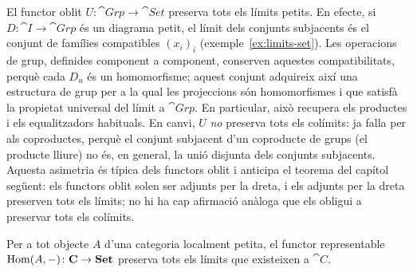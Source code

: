 \begin{exemple}
El functor oblit $U\colon\cat{Grp}\to\cat{Set}$ preserva tots els límits petits. En efecte, si $D\colon\cat{I}\to\cat{Grp}$ és un diagrama petit, el límit dels conjunts subjacents és el conjunt de famílies compatibles $(x_i)_i$ (exemple~\ref{ex:limits-set}). Les operacions de grup, definides component a component, conserven aquestes compatibilitats, perquè cada $D_u$ és un homomorfisme; aquest conjunt adquireix així una estructura de grup per a la qual les projeccions són homomorfismes i que satisfà la propietat universal del límit a $\cat{Grp}$. En particular, això recupera els productes i els equalitzadors habituals. En canvi, $U$ \emph{no} preserva tots els colímits: ja falla per als coproductes, perquè el conjunt subjacent d'un coproducte de grups (el producte lliure) no és, en general, la unió disjunta dels conjunts subjacents. Aquesta asimetria és típica dels functors oblit i anticipa el teorema del capítol següent: els functors oblit solen ser adjunts per la dreta, i els adjunts per la dreta preserven tots els límits; no hi ha cap afirmació anàloga que els obligui a preservar tots els colímits.
\end{exemple}

\begin{proposicio}\label{prop:representables-limits}
Per a tot objecte $A$ d'una categoria localment petita, el functor representable $\operatorname{Hom}(A,-)\colon\mathbf{C}\to\mathbf{Set}$ preserva tots els límits que existeixen a $\cat{C}$.
\end{proposicio}

